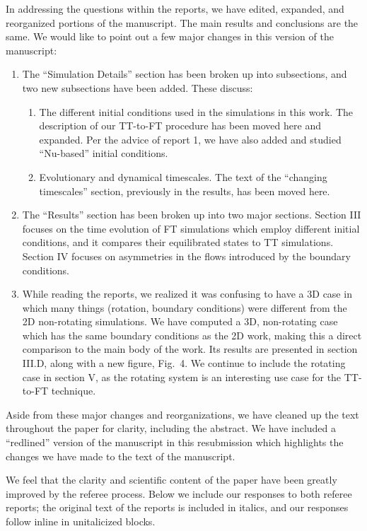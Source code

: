 \documentclass[aps, 11pt, singlecolumn]{revtex4-1} %
\begin{document}
\begin{singlespace}
In addressing the questions within the reports, we have edited, expanded, and reorganized portions of the manuscript.
The main results and conclusions are the same.
We would like to point out a few major changes in this version of the manuscript:
\begin{enumerate}
\item The ``Simulation Details'' section has been broken up into subsections, and two new subsections have been added. These discuss:
\begin{enumerate}
\item The different initial conditions used in the simulations in this work.
The description of our TT-to-FT procedure has been moved here and expanded.
Per the advice of report 1, we have also added and studied ``Nu-based'' initial conditions.
\item Evolutionary and dynamical timescales.
The text of the ``changing timescales'' section, previously in the results, has been moved here.
\end{enumerate}
\item The ``Results'' section has been broken up into two major sections.
Section III focuses on the time evolution of FT simulations which employ different initial conditions, and it compares their equilibrated states to TT simulations.
Section IV focuses on asymmetries in the flows introduced by the boundary conditions.
\item While reading the reports, we realized it was confusing to have a 3D case in which many things (rotation, boundary conditions) were different from the 2D non-rotating simulations.
We have computed a 3D, non-rotating case which has the same boundary conditions as the 2D work, making this a direct comparison to the main body of the work.
Its results are presented in section III.D, along with a new figure, Fig.~4.
We continue to include the rotating case in section V, as the rotating system is an interesting use case for the TT-to-FT technique.
\end{enumerate}
Aside from these major changes and reorganizations, we have cleaned up the text throughout the paper for clarity, including the abstract.
We have included a ``redlined'' version of the manuscript in this resubmission which highlights the changes we have made to the text of the manuscript.

We feel that the clarity and scientific content of the paper have been greatly improved by the referee process. 
Below we include our responses to both referee reports; the original text of the reports is included in italics, and our responses follow inline in unitalicized blocks.


\end{singlespace}
\end{document}

